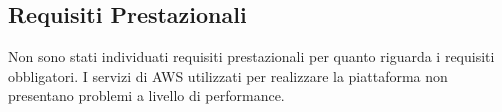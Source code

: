 \subsection{Requisiti Prestazionali}

Non sono stati individuati requisiti prestazionali per quanto riguarda i requisiti obbligatori. I servizi di AWS utilizzati per realizzare la piattaforma non presentano problemi a livello di performance. 